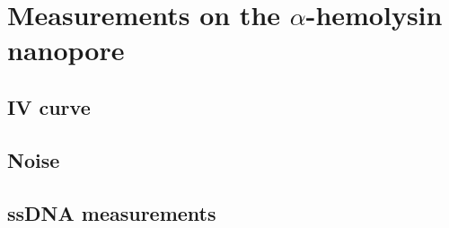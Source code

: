 \chapter{Measurements on the $\alpha$-hemolysin nanopore}
\label{alpha_hemolysin}

\section{IV curve}

\section{Noise}

\section{ssDNA measurements}